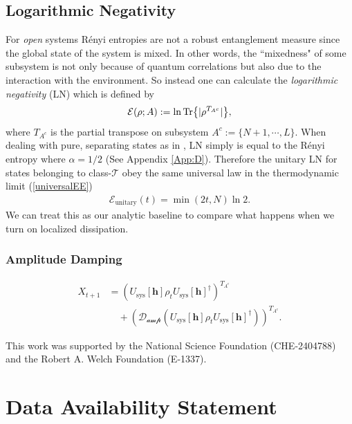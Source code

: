 \documentclass[aps,pra,reprint,amsmath,amssymb]{revtex4-2}
\newcommand{\Usys}[0]{U_{\text{sys}}[\bm{h}]}
\begin{document}
\subsection{Logarithmic Negativity}
For {\it open} systems Rényi entropies are not a robust entanglement measure since the global state of the system is mixed. In other words, the ``mixedness" of some subsystem is not only because of quantum correlations but also due to the interaction with the environment. So instead one can calculate the {\it logarithmic negativity} (LN) which is defined by
\begin{align}
    \mathcal{E}(\rho;A):=\ln \Tr{|\rho^{T_{A^c}}|}, 
\end{align}
where $T_{A^c}$ is the partial transpose on subsystem $A^c:=\{N+1,\cdots,L\}$. When dealing with pure, separating states as in \cite{bertini2019entanglement}, LN simply is equal to the Rényi entropy where $\alpha=1/2$ (See Appendix \ref{App:D}). Therefore the unitary LN for states belonging to class-$\mathcal{T}$ obey the same universal law in the thermodynamic limit (\ref{universalEE})
\begin{align}
    \mathcal{E}_{\text{unitary}}(t)=\min(2t,N)\ln2.
\end{align}
We can treat this as our analytic baseline to compare what happens when we turn on localized dissipation. 
\subsubsection{Amplitude Damping}
\begin{align}
    X_{t+1}&= \left(\Usys\rho_t \Usys^{\dagger}\right)^{T_{A^c}}\nonumber\\
    &\quad+\left(\mathcal{D_{\text{amp}}}\left(\Usys \rho_t\Usys^\dagger\right)\right)^{T_{A^c}}.
\end{align}
\begin{acknowledgments}
This work was supported by the National Science Foundation (CHE-2404788) and the Robert A. Welch Foundation (E-1337). 
\end{acknowledgments}



\section*{Data Availability Statement}
\end{document}
